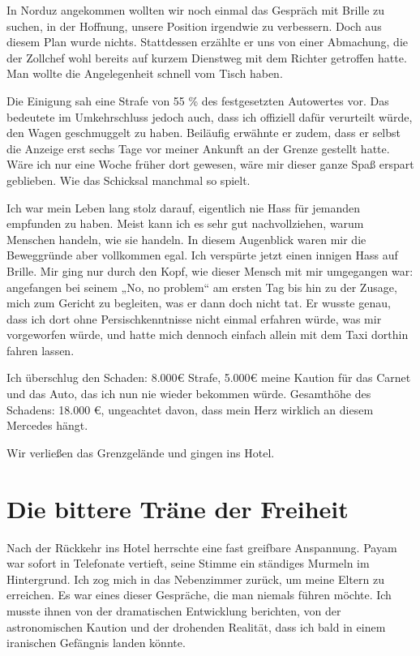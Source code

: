 In Norduz angekommen wollten wir noch einmal das Gespräch mit Brille zu suchen, in der Hoffnung, unsere Position irgendwie zu verbessern. Doch aus diesem Plan wurde nichts. Stattdessen erzählte er uns von einer Abmachung, die der Zollchef wohl bereits auf kurzem Dienstweg mit dem Richter getroffen hatte. Man wollte die Angelegenheit schnell vom Tisch haben.

Die Einigung sah eine Strafe von 55 \% des festgesetzten Autowertes vor. Das bedeutete im Umkehrschluss jedoch auch, dass ich offiziell dafür verurteilt würde, den Wagen geschmuggelt zu haben. Beiläufig erwähnte er zudem, dass er selbst die Anzeige erst sechs Tage vor meiner Ankunft an der Grenze gestellt hatte. Wäre ich nur eine Woche früher dort gewesen, wäre mir dieser ganze Spaß erspart geblieben. Wie das Schicksal manchmal so spielt.

Ich war mein Leben lang stolz darauf, eigentlich nie Hass für jemanden empfunden zu haben. Meist kann ich es sehr gut nachvollziehen, warum Menschen handeln, wie sie handeln. In diesem Augenblick waren mir die Beweggründe aber vollkommen egal. Ich verspürte jetzt einen innigen Hass auf Brille. Mir ging nur durch den Kopf, wie dieser Mensch mit mir umgegangen war: angefangen bei seinem „No, no problem“ am ersten Tag bis hin zu der Zusage, mich zum Gericht zu begleiten, was er dann doch nicht tat. Er wusste genau, dass ich dort ohne Persischkenntnisse nicht einmal erfahren würde, was mir vorgeworfen würde, und hatte mich dennoch einfach allein mit dem Taxi dorthin fahren lassen.

Ich überschlug den Schaden: 8.000€ Strafe, 5.000€ meine Kaution für das Carnet und das Auto, das ich nun nie wieder bekommen würde. Gesamthöhe des Schadens: 18.000 €, ungeachtet davon, dass mein Herz wirklich an diesem Mercedes hängt.

Wir verließen das Grenzgelände und gingen ins Hotel.

\chapter*{Die bittere Träne der Freiheit}

Nach der Rückkehr ins Hotel herrschte eine fast greifbare Anspannung. Payam war sofort in Telefonate vertieft, seine Stimme ein ständiges Murmeln im Hintergrund. Ich zog mich in das Nebenzimmer zurück, um meine Eltern zu erreichen. Es war eines dieser Gespräche, die man niemals führen möchte. Ich musste ihnen von der dramatischen Entwicklung berichten, von der astronomischen Kaution und der drohenden Realität, dass ich bald in einem iranischen Gefängnis landen könnte.

